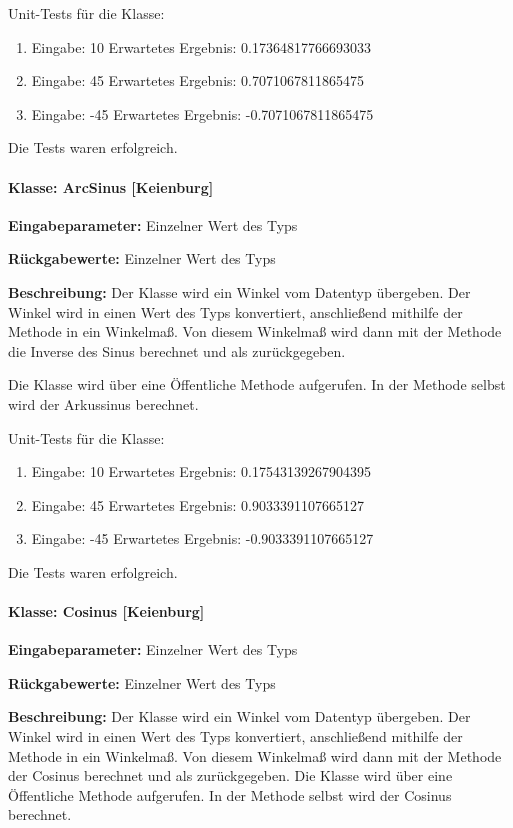Unit-Tests für die Klasse: 	
\begin{enumerate}
	\item Eingabe:  10 Erwartetes Ergebnis: 0.17364817766693033
	\item Eingabe:  45 Erwartetes Ergebnis: 0.7071067811865475
	\item Eingabe: -45 Erwartetes Ergebnis: -0.7071067811865475
\end{enumerate}
Die Tests waren erfolgreich.

\paragraph{Klasse: ArcSinus [Keienburg]}
\textbf{Eingabeparameter: } Einzelner Wert des Typs 

\textbf{Rückgabewerte: } Einzelner Wert des Typs 

\textbf{Beschreibung: } Der Klasse wird ein Winkel vom Datentyp  übergeben. Der Winkel wird in einen Wert des Typs  konvertiert, anschließend mithilfe der Methode  in ein Winkelmaß. Von diesem Winkelmaß wird dann mit der Methode  die Inverse des Sinus berechnet und als  zurückgegeben.  

Die Klasse wird über eine Öffentliche Methode aufgerufen. In der Methode selbst wird der Arkussinus berechnet. 

Unit-Tests für die Klasse: 	
\begin{enumerate}
	\item Eingabe:  10 Erwartetes Ergebnis: 0.17543139267904395
	\item Eingabe:  45 Erwartetes Ergebnis: 0.9033391107665127
	\item Eingabe: -45 Erwartetes Ergebnis: -0.9033391107665127
\end{enumerate}
Die Tests waren erfolgreich.

\paragraph{Klasse: Cosinus [Keienburg]}
\textbf{Eingabeparameter: } Einzelner Wert des Typs 
	
\textbf{Rückgabewerte: } Einzelner Wert des Typs 
	
\textbf{Beschreibung: } Der Klasse wird ein Winkel vom Datentyp  übergeben. Der Winkel wird in einen Wert des Typs  konvertiert, anschließend mithilfe der Methode  in ein Winkelmaß. Von diesem Winkelmaß wird dann mit der Methode  der Cosinus berechnet und als  zurückgegeben.  Die Klasse wird über eine Öffentliche Methode aufgerufen. In der Methode selbst wird der Cosinus berechnet. 
	
